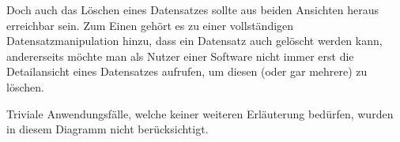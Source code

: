 Doch auch das Löschen eines Datensatzes sollte aus beiden Ansichten heraus erreichbar sein. Zum Einen gehört es
zu einer vollständigen Datensatzmanipulation hinzu, dass ein Datensatz auch gelöscht werden kann, andererseits möchte
man als Nutzer einer Software nicht immer erst die Detailansicht eines Datensatzes aufrufen, um diesen (oder gar mehrere)
zu löschen.

Triviale Anwendungsfälle, welche keiner weiteren Erläuterung bedürfen, wurden in diesem Diagramm nicht berücksichtigt.
